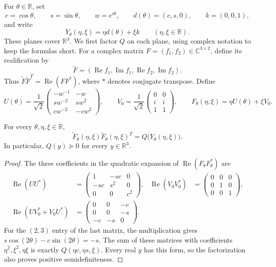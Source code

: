 For $\theta\in\mathbb R$, set
\[
 c=\cos\theta,\qquad s=\sin\theta,\qquad w=e^{i\theta},
 \qquad d(\theta)=(c,s,0),\qquad k=(0,0,1),
\]
and write
\[
 Y_\theta(\eta,\xi)=\eta d(\theta)+\xi k
 \qquad (\eta,\xi\in\mathbb R).
\]
These planes cover $\mathbb R^3$.  We first factor $Q$ on each plane,
using complex notation to keep the formulas short.  For a complex matrix
$F=(f_1,f_2)\in\mathbb C^{3\times2}$, define its realification by
\[
 \widetilde F=(\operatorname{Re}f_1,\operatorname{Im}f_1,
                 \operatorname{Re}f_2,\operatorname{Im}f_2).
\]
Thus $\widetilde F\widetilde F^T=\operatorname{Re}(FF^*)$, where $*$
denotes conjugate transpose.  Define
\begin{equation}\label{eq:U}
 U(\theta)=\frac1{\sqrt2}
 \begin{pmatrix}
 -w^{-1}&-w\\
 sw^{-2}&sw^2\\
 cw^{-2}&-cw^2
 \end{pmatrix},\qquad
 V_0=\frac1{\sqrt2}
 \begin{pmatrix}0&0\\ i&i\\1&1\end{pmatrix},
 \qquad F_\theta(\eta,\xi)=\eta U(\theta)+\xi V_0.
\end{equation}

\begin{lemma}\label{lem:gram}
For every $\theta,\eta,\xi\in\mathbb R$,
\begin{equation}\label{eq:gram}
 \widetilde F_\theta(\eta,\xi)
 \widetilde F_\theta(\eta,\xi)^T
 =Q\bigl(Y_\theta(\eta,\xi)\bigr).
\end{equation}
In particular, $Q(y)\succeq0$ for every $y\in\mathbb R^3$.
\end{lemma}

\begin{proof}
The three coefficients in the quadratic expansion of
$\operatorname{Re}(F_\theta F_\theta^*)$ are
\begin{align*}
 \operatorname{Re}(UU^*)&=
 \begin{pmatrix}1&-sc&0\\-sc&s^2&0\\0&0&c^2\end{pmatrix},
 &\operatorname{Re}(V_0V_0^*)&=
 \begin{pmatrix}0&0&0\\0&1&0\\0&0&1\end{pmatrix},\\
 \operatorname{Re}(UV_0^*+V_0U^*)&=
 \begin{pmatrix}0&0&-c\\0&0&-s\\-c&-s&0\end{pmatrix}.
\end{align*}
For the $(2,3)$ entry of the last matrix, the multiplication gives
$s\cos(2\theta)-c\sin(2\theta)=-s$.
The sum of these matrices with coefficients $\eta^2,\xi^2,\eta\xi$
is exactly $Q(\eta c,\eta s,\xi)$.  Every real $y$ has this form,
so the factorization also proves positive semidefiniteness.
\end{proof}
